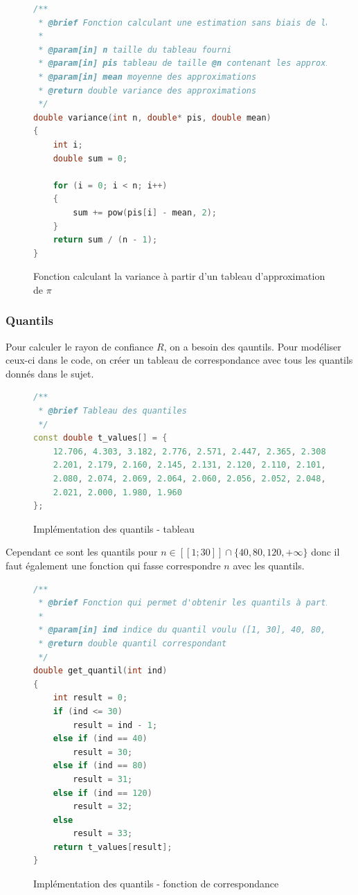 \documentclass{article}
\begin{document}
\begin{figure}[!ht]
\caption{Fonction calculant la variance à partir d'un tableau d'approximation de $\pi$}
\begin{lstlisting}[language=c++]
/**
 * @brief Fonction calculant une estimation sans biais de la variance d'un tableau (en l'occurence de PI)
 * 
 * @param[in] n taille du tableau fourni
 * @param[in] pis tableau de taille @n contenant les approximations
 * @param[in] mean moyenne des approximations
 * @return double variance des approximations
 */
double variance(int n, double* pis, double mean)
{
    int i;
    double sum = 0;

    for (i = 0; i < n; i++)
    {
        sum += pow(pis[i] - mean, 2);
    }
    return sum / (n - 1);
}
\end{lstlisting}
\end{figure}

\subsubsection{Quantils}
Pour calculer le rayon de confiance $R$, on a besoin des qauntils. Pour modéliser
ceux-ci dans le code, on créer un tableau de correspondance avec tous les quantils
donnés dans le sujet.

\begin{figure}[!ht]
\caption{Implémentation des quantils - tableau}
\begin{lstlisting}[language=c++]
/**
 * @brief Tableau des quantiles
 */
const double t_values[] = {
    12.706, 4.303, 3.182, 2.776, 2.571, 2.447, 2.365, 2.308, 2.262, 2.228,
    2.201, 2.179, 2.160, 2.145, 2.131, 2.120, 2.110, 2.101, 2.093, 2.086,
    2.080, 2.074, 2.069, 2.064, 2.060, 2.056, 2.052, 2.048, 2.045, 2.042,
    2.021, 2.000, 1.980, 1.960
};
\end{lstlisting}
\end{figure}

Cependant ce sont les quantils pour $n \in [\![1;30]\!] \cap \{40, 80, 120, +\infty \}$
donc il faut également une fonction qui fasse correspondre $n$ avec les quantils.

\begin{figure}[!ht]
\caption{Implémentation des quantils - fonction de correspondance}
\begin{lstlisting}[language=c++]
/**
 * @brief Fonction qui permet d'obtenir les quantils à partir du tableau t_values
 * 
 * @param[in] ind indice du quantil voulu ([1, 30], 40, 80, 120, inf)
 * @return double quantil correspondant
 */
double get_quantil(int ind)
{
    int result = 0;
    if (ind <= 30)
        result = ind - 1;
    else if (ind == 40)
        result = 30;
    else if (ind == 80)
        result = 31;
    else if (ind == 120)
        result = 32;
    else
        result = 33;
    return t_values[result];
}
\end{lstlisting}
\end{figure}
\end{document}
